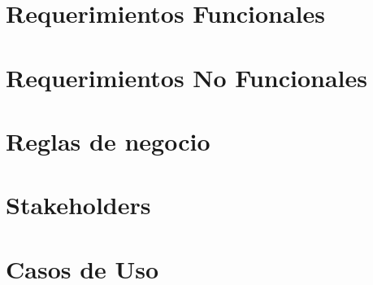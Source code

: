 \section{Requerimientos Funcionales}

\section{Requerimientos No Funcionales}

\section{Reglas de negocio}

\section{Stakeholders}

\section{Casos de Uso}
